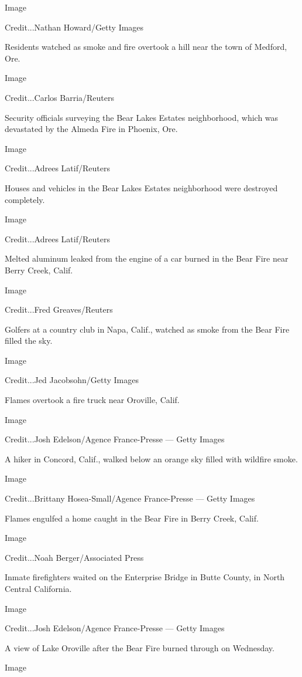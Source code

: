 Image

Credit...Nathan Howard/Getty Images

Residents watched as smoke and fire overtook a hill near the town of
Medford, Ore.

Image

Credit...Carlos Barria/Reuters

Security officials surveying the Bear Lakes Estates neighborhood, which
was devastated by the Almeda Fire in Phoenix, Ore.

Image

Credit...Adrees Latif/Reuters

Houses and vehicles in the Bear Lakes Estates neighborhood were
destroyed completely.

Image

Credit...Adrees Latif/Reuters

Melted aluminum leaked from the engine of a car burned in the Bear Fire
near Berry Creek, Calif.

Image

Credit...Fred Greaves/Reuters

Golfers at a country club in Napa, Calif., watched as smoke from the
Bear Fire filled the sky.

Image

Credit...Jed Jacobsohn/Getty Images

Flames overtook a fire truck near Oroville, Calif.

Image

Credit...Josh Edelson/Agence France-Presse --- Getty Images

A hiker in Concord, Calif., walked below an orange sky filled with
wildfire smoke.

Image

Credit...Brittany Hosea-Small/Agence France-Presse --- Getty Images

Flames engulfed a home caught in the Bear Fire in Berry Creek, Calif.

Image

Credit...Noah Berger/Associated Press

Inmate firefighters waited on the Enterprise Bridge in Butte County, in
North Central California.

Image

Credit...Josh Edelson/Agence France-Presse --- Getty Images

A view of Lake Oroville after the Bear Fire burned through on Wednesday.

Image

